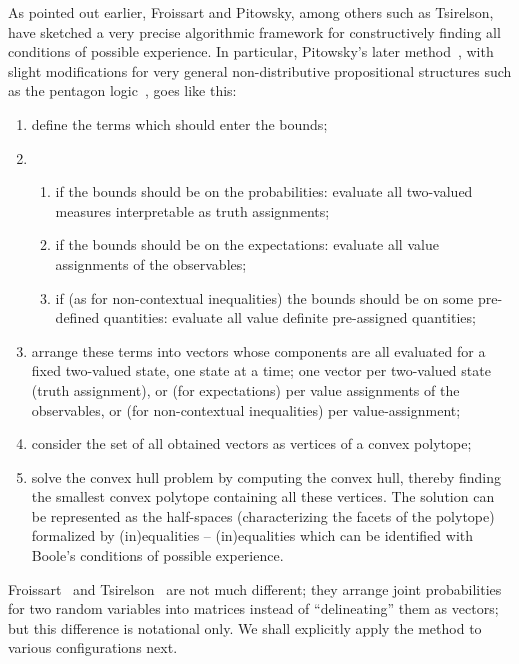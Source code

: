 As pointed out earlier, Froissart and  Pitowsky, among others such as  Tsirelson, have
sketched a very precise algorithmic framework for constructively finding all conditions of possible experience.
In particular,
Pitowsky's later method~\cite{pitowsky,pitowsky-89a,Pit-91,Pit-94,2000-poly},
with slight modifications for very general non-distributive propositional structures
such as the pentagon logic~\cite{svozil-2001-eua,svozil-2008-ql,svozil-2016-s}, goes like this:
\begin{enumerate}
\item
define the terms which should enter the bounds;


\item
\begin{enumerate}
\item
if the bounds should be on the probabilities: evaluate all two-valued measures interpretable as truth assignments;

\item
if the bounds should be on the expectations: evaluate all value assignments of the observables;

\item
if (as for non-contextual inequalities) the bounds should be on some pre-defined quantities: evaluate all value definite pre-assigned quantities;
\end{enumerate}

\item
arrange these terms into vectors whose components are all evaluated for a fixed two-valued state, one state at a time;
one vector per two-valued state (truth assignment), or (for expectations)
per value assignments of the observables, or (for non-contextual inequalities) per value-assignment;

\item
consider the set of all obtained vectors as vertices of a convex polytope;

\item
solve the convex hull problem  by computing the convex hull, thereby
finding the smallest convex polytope containing all these vertices.
The solution can be represented as
the half-spaces (characterizing the facets of the polytope) formalized by (in)equalities --
(in)equalities which  can be identified with  Boole's conditions of possible experience.


\end{enumerate}

Froissart~\cite{froissart-81} and Tsirelson~\cite{cirelson} are not much different;
they arrange joint probabilities for two random variables into matrices instead of ``delineating'' them as vectors;
but this difference is notational only. We shall explicitly apply the method to various configurations next.






